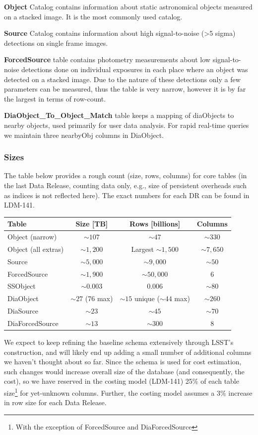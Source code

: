 \documentclass[DM,lsstdraft,toc]{lsstdoc}
\begin{document}
\textbf{Object} Catalog contains information about static astronomical objects measured on a stacked image. It is the most commonly used catalog.

\textbf{Source} Catalog contains information about high signal-to-noise (>5 sigma) detections on single frame images.

\textbf{ForcedSource} table contains photometry measurements about low signal-to-noise detections done on individual exposures in each place where an object was detected on a stacked image. Due to the nature of these detections only a few parameters can be measured, thus the table is very narrow, however it is by far the largest in terms of row-count.

\textbf{DiaObject\_To\_Object\_Match} table keeps a mapping of diaObjects to nearby objects, used primarily for user data analysis. For rapid real-time queries we maintain three nearbyObj columns in DiaObject.

\subsubsection{Sizes}

The table below provides a rough count (size, rows, columns) for core tables (in the last Data Release, counting data only, e.g., size of persistent overheads such as indices is not reflected here). The exact numbers for each DR can be found in LDM-141.

\begin{tabular}{lccc}
  \hline\hline
  Table & Size [TB] & Rows  [billions] & Columns \\
  \hline\hline
  Object (narrow) & $\sim107$ & $\sim47$ & $\sim330$ \\
  Object (all extras) & $\sim1,200$ & Largest $\sim1,500$ & $\sim7,650$ \\
  Source & $\sim5,000$ & $\sim9,000$ & $\sim50$ \\
  ForcedSource & $\sim1,900$ & $\sim50,000$ & 6 \\
  SSObject & $\sim0.003$ & 0.006 & $\sim80$ \\
  DiaObject & $\sim27$ (76 max) & $\sim15$ unique ($\sim44$ max) & $\sim260$ \\
  DiaSource & $\sim23$ & $\sim45$ & $\sim70$ \\
  DiaForcedSource & $\sim13$ & $\sim300$ & 8 \\
  \hline
\end{tabular}

We expect to keep refining the baseline schema extensively through LSST’s construction, and will likely end up adding a small number of additional columns we haven’t thought about so far. Since the schema is used for cost estimation, such changes would increase overall size of the database (and consequently, the cost), so we have reserved in the costing model (LDM-141) 25\% of each table size\footnote{With the exception of ForcedSource and DiaForcedSource} for yet-unknown columns. Further, the costing model assumes a 3\% increase in row size for each Data Release.
\end{document}
